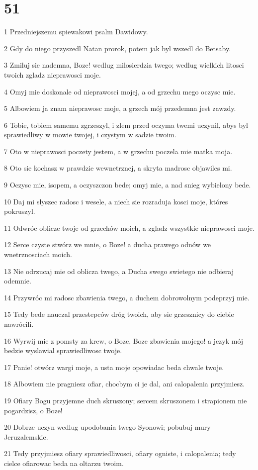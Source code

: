 \chapter{51}

\par 1 Przedniejszemu spiewakowi psalm Dawidowy.
\par 2 Gdy do niego przyszedl Natan prorok, potem jak byl wszedl do Betsaby.
\par 3 Zmiluj sie nademna, Boze! wedlug milosierdzia twego; wedlug wielkich litosci twoich zgladz nieprawosci moje.
\par 4 Omyj mie doskonale od nieprawosci mojej, a od grzechu mego oczysc mie.
\par 5 Albowiem ja znam nieprawosc moje, a grzech mój przedemna jest zawzdy.
\par 6 Tobie, tobiem samemu zgrzeszyl, i zlem przed oczyma twemi uczynil, abys byl sprawiedliwy w mowie twojej, i czystym w sadzie twoim.
\par 7 Oto w nieprawosci poczety jestem, a w grzechu poczela mie matka moja.
\par 8 Oto sie kochasz w prawdzie wewnetrznej, a skryta madrosc objawiles mi.
\par 9 Oczysc mie, isopem, a oczyszczon bede; omyj mie, a nad snieg wybielony bede.
\par 10 Daj mi slyszec radosc i wesele, a niech sie rozraduja kosci moje, któres pokruszyl.
\par 11 Odwróc oblicze twoje od grzechów moich, a zgladz wszystkie nieprawosci moje.
\par 12 Serce czyste stwórz we mnie, o Boze! a ducha prawego odnów we wnetrznosciach moich.
\par 13 Nie odrzucaj mie od oblicza twego, a Ducha swego swietego nie odbieraj odemnie.
\par 14 Przywróc mi radosc zbawienia twego, a duchem dobrowolnym podeprzyj mie.
\par 15 Tedy bede nauczal przestepców dróg twoich, aby sie grzesznicy do ciebie nawrócili.
\par 16 Wyrwij mie z pomsty za krew, o Boze, Boze zbawienia mojego! a jezyk mój bedzie wyslawial sprawiedliwosc twoje.
\par 17 Panie! otwórz wargi moje, a usta moje opowiadac beda chwale twoje.
\par 18 Albowiem nie pragniesz ofiar, chocbym ci je dal, ani calopalenia przyjmiesz.
\par 19 Ofiary Bogu przyjemne duch skruszony; sercem skruszonem i strapionem nie pogardzisz, o Boze!
\par 20 Dobrze uczyn wedlug upodobania twego Syonowi; pobubuj mury Jeruzalemskie.
\par 21 Tedy przyjmiesz ofiary sprawiedliwosci, ofiary ogniste, i calopalenia; tedy cielce ofiarowac beda na oltarzu twoim.


